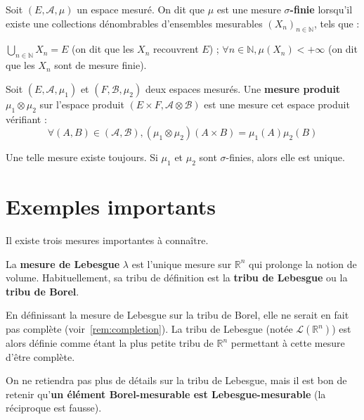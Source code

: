 \documentclass[../integ-proba.tex]{subfiles}
\begin{document}
  \begin{defi}
    Soit $\left(E, \mathcal{A}, \mu\right)$ un espace mesuré.
    On dit que $\mu$ est une mesure $\sigma$\textbf{-finie} lorsqu'il existe une collections dénombrables d'ensembles mesurables $\left(X_n\right)_{n \in \mathbb{N}}$, tels que :
    \begin{itemize}
      \itemb $\displaystyle \bigcup_{n \in \mathbb{N}} X_n = E$ (on dit que les $X_n$ recouvrent $E$) ;
      \itemb $\forall n \in \mathbb{N}, \mu(X_n) < + \infty$ (on dit que les $X_n$ sont de mesure finie).
    \end{itemize}
  \end{defi}

  \begin{defi}
    Soit $\left(E, \mathcal{A}, \mu_1\right)$ et $\left(F, \mathcal{B}, \mu_2\right)$ deux espaces mesurés.
    Une \textbf{mesure produit} $\mu_1 \otimes \mu_2$ sur l'espace produit $\left(E \times F, \mathcal{A} \otimes \mathcal{B}\right)$ est une mesure cet espace produit vérifiant :
    \begin{displaymath}
      \forall \left(A, B\right) \in \left(\mathcal{A}, \mathcal{B}\right), (\mu_1 \otimes \mu_2)(A \times B) = \mu_1(A)\mu_2(B)
    \end{displaymath}

    Une telle mesure existe toujours.
    Si $\mu_1$ et $\mu_2$ sont $\sigma$-finies, alors elle est unique.
  \end{defi}


  \section{Exemples importants}
  Il existe trois mesures importantes à connaître.

  \begin{defi}
    La \textbf{mesure de Lebesgue} $\lambda$ est l'unique mesure sur $\mathbb{R}^n$ qui prolonge la notion de volume.
    Habituellement, sa tribu de définition est la \textbf{tribu de Lebesgue} ou la \textbf{tribu de Borel}.
  \end{defi}

  \begin{rem}
    En définissant la mesure de Lebesgue sur la tribu de Borel, elle ne serait en fait pas complète (voir~\ref{rem:completion}).
    La tribu de Lebesgue (notée $\mathcal{L}(\mathbb{R}^n)$) est alors définie comme étant la plus petite tribu de $\mathbb{R}^n$ permettant à cette mesure d'être complète.

    On ne retiendra pas plus de détails sur la tribu de Lebesgue, mais il est bon de retenir qu'\textbf{un élément Borel-mesurable est Lebesgue-mesurable} (la réciproque est fausse).
  \end{rem}
\end{document}
